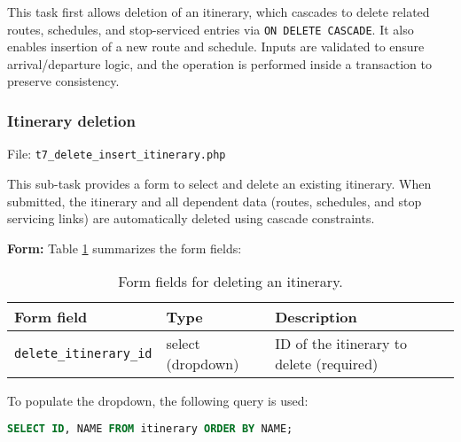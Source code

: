 \documentclass[a4paper, 12pt]{article}
\begin{document}
This task first allows deletion of an itinerary, which cascades to delete related routes, schedules, and stop-serviced entries via \texttt{ON DELETE CASCADE}. It also enables insertion of a new route and schedule. Inputs are validated to ensure arrival/departure logic, and the operation is performed inside a transaction to preserve consistency.


\subsubsection{Itinerary deletion}

File: \texttt{t7\_delete\_insert\_itinerary.php}

This sub-task provides a form to select and delete an existing itinerary. When submitted, the itinerary and all dependent data (routes, schedules, and stop servicing links) are automatically deleted using cascade constraints.

\textbf{Form:} Table \ref{tab:p3-t7-delete-form-fields} summarizes the form fields:

\begin{table}[H]
    \centering
    \footnotesize
    \caption{Form fields for deleting an itinerary.}
    \label{tab:p3-t7-delete-form-fields}
    \begin{tabular}{lll}
        \toprule
        \textbf{Form field} & \textbf{Type} & \textbf{Description} \\
        \midrule
        \texttt{delete\_itinerary\_id} & select (dropdown) & ID of the itinerary to delete (required) \\
        \bottomrule
    \end{tabular}
\end{table}


To populate the dropdown, the following query is used:

\begin{lstlisting}[language=SQL]
SELECT ID, NAME FROM itinerary ORDER BY NAME;
\end{lstlisting}
\end{document}
